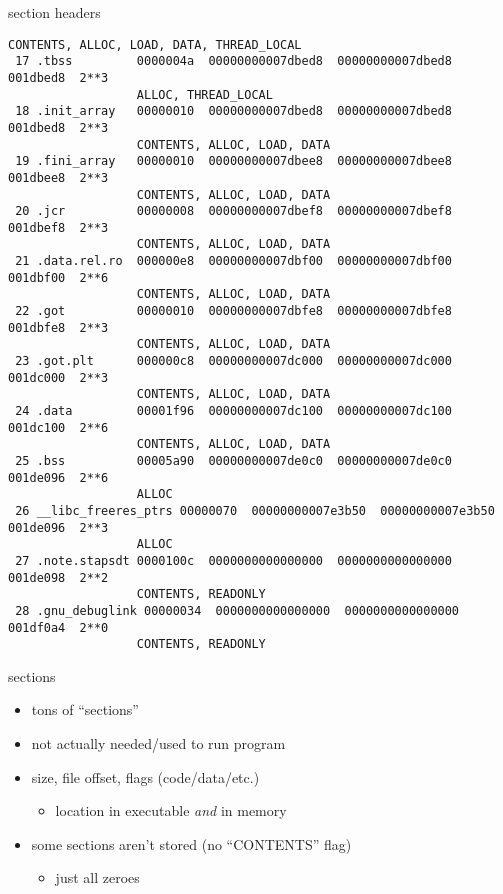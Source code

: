 \begin{frame}[fragile,label=sectHeader]{section headers}
\begin{Verbatim}[fontsize=\tiny]
                  CONTENTS, ALLOC, LOAD, DATA, THREAD_LOCAL
 17 .tbss         0000004a  00000000007dbed8  00000000007dbed8  001dbed8  2**3
                  ALLOC, THREAD_LOCAL
 18 .init_array   00000010  00000000007dbed8  00000000007dbed8  001dbed8  2**3
                  CONTENTS, ALLOC, LOAD, DATA
 19 .fini_array   00000010  00000000007dbee8  00000000007dbee8  001dbee8  2**3
                  CONTENTS, ALLOC, LOAD, DATA
 20 .jcr          00000008  00000000007dbef8  00000000007dbef8  001dbef8  2**3
                  CONTENTS, ALLOC, LOAD, DATA
 21 .data.rel.ro  000000e8  00000000007dbf00  00000000007dbf00  001dbf00  2**6
                  CONTENTS, ALLOC, LOAD, DATA
 22 .got          00000010  00000000007dbfe8  00000000007dbfe8  001dbfe8  2**3
                  CONTENTS, ALLOC, LOAD, DATA
 23 .got.plt      000000c8  00000000007dc000  00000000007dc000  001dc000  2**3
                  CONTENTS, ALLOC, LOAD, DATA
 24 .data         00001f96  00000000007dc100  00000000007dc100  001dc100  2**6
                  CONTENTS, ALLOC, LOAD, DATA
 25 .bss          00005a90  00000000007de0c0  00000000007de0c0  001de096  2**6
                  ALLOC
 26 __libc_freeres_ptrs 00000070  00000000007e3b50  00000000007e3b50  001de096  2**3
                  ALLOC
 27 .note.stapsdt 0000100c  0000000000000000  0000000000000000  001de098  2**2
                  CONTENTS, READONLY
 28 .gnu_debuglink 00000034  0000000000000000  0000000000000000  001df0a4  2**0
                  CONTENTS, READONLY
\end{Verbatim}
\end{frame}

\begin{frame}{sections}
\begin{itemize}
\item tons of ``sections''
\item not actually needed/used to run program
\item size, file offset, flags (code/data/etc.)
    \begin{itemize}
    \item location in executable \textit{and} in memory
    \end{itemize}
\item some sections aren't stored (no ``CONTENTS'' flag) 
    \begin{itemize}
    \item just all zeroes
    \end{itemize}
\end{itemize}
\end{frame}

